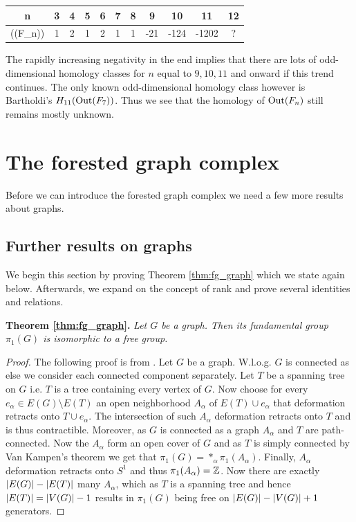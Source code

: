\begin{table}[htpb]
	\centering
	\begin{tabular}{C|C|C|C|C|C|C|C|C|C|C}
		n & 3 & 4 & 5 & 6 & 7 & 8 & 9 & 10 & 11 & 12\\ \hline
		\chi(\out(F_{n})) & 1 & 2 & 1 & 2 & 1 & 1 & -21 & -124 & -1202 & ?
	\end{tabular}
\end{table}

The rapidly increasing negativity in the end implies that there are lots of odd-dimensional homology classes for $n$ equal to  $9,10,11$
and onward if this trend continues.
The only known odd-dimensional homology class however is Bartholdi's $H_{11}(\operatorname{Out}(F_{7}))$.
Thus we see that the homology of $\operatorname{Out}(F_{n})$ still remains mostly unknown.

\newpage
\section{The forested graph complex}
Before we can introduce the forested graph complex we need a few more results about graphs.
\subsection{Further results on graphs}
\label{sec:RankGraph}
We begin this section by proving Theorem \ref{thm:fg_graph} which we state again below.
Afterwards, we expand on the concept of rank and prove several identities and relations.

\textbf{Theorem \ref{thm:fg_graph}.} \textit{Let $G$ be a graph. Then its fundamental group $\pi_{1}(G)$ is isomorphic to a free group.}

\begin{proof}
	The following proof is from \cite[p. 43f]{hatcher00}.
	Let $G$ be a graph. W.l.o.g. $G$ is connected as else we consider each connected component separately. 
	Let $T$ be a spanning tree on $G$ i.e. $T$ is a tree containing every vertex of $G$.
	Now choose for every $e_{\alpha} \in E(G) \setminus E(T)$ an open neighborhood $A_{\alpha}$ of $E(T) \cup e_{\alpha}$ that deformation retracts onto $T \cup e_{\alpha}$.
	The intersection of such $A_{\alpha}$ deformation retracts onto $T$ and is thus contractible. 
	Moreover, as $G$ is connected as a graph $A_{\alpha}$ and $T$ are path-connected.
	Now the $A_{\alpha}$ form an open cover of $G$ and as $T$ is simply connected by Van Kampen's theorem we get that $\pi_{1}(G) = *_{\alpha} \pi_{1}(A_{\alpha})$.
	Finally, $A_{\alpha}$ deformation retracts onto $S^{1}$ and thus $\pi_{1}(A_{\alpha}) = \mathbb{Z}$. Now there are exactly $\abs{E(G)} - \abs{E(T)}$ many $A_{\alpha}$,
	which as $T$ is a spanning tree and hence $\abs{E(T)} = \abs{V(G)}-1$ results in $\pi_1(G)$ being free on $\abs{E(G)} - \abs{V(G)} + 1$ generators.
\end{proof}

